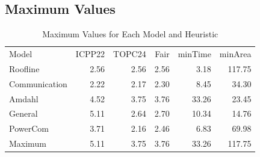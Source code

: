 \documentclass{article}
\begin{document}
\subsection{Maximum Values}
\begin{table}[htbp]
\centering
\caption{Maximum Values for Each Model and Heuristic}
\label{tab:maximum_values}
\begin{tabular}{lrrrrr}
\toprule
Model & ICPP22 & TOPC24 & Fair & minTime & minArea \\
Roofline & 2.56 & 2.56 & 2.56 & 3.18 & 117.75 \\
Communication & 2.22 & 2.17 & 2.30 & 8.45 & 34.30 \\
Amdahl & 4.52 & 3.75 & 3.76 & 33.26 & 23.45 \\
General & 5.11 & 2.64 & 2.70 & 10.34 & 14.76 \\
PowerCom & 3.71 & 2.16 & 2.46 & 6.83 & 69.98 \\
\midrule
Maximum & 5.11 & 3.75 & 3.76 & 33.26 & 117.75 \\
\bottomrule
\end{tabular}
\end{table}


\FloatBarrier 



\end{document}
